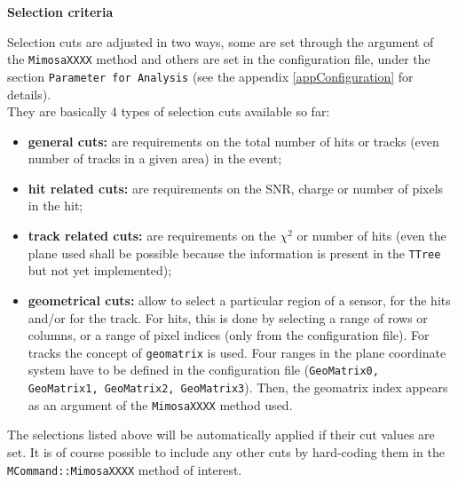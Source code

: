 \documentclass[a4paper, 12pt, twoside]{article}
\begin{document}
\vspace{0.8 cm}

\noindent
{\bf Selection criteria}

\noindent
Selection cuts are adjusted in two ways, some are set through the argument of the {\tt MimosaXXXX} method and others are set in the configuration file, under the section {\tt Parameter for Analysis} (see the appendix \ref{appConfiguration} for details).\\
They are basically 4 types of selection cuts available so far:
\begin{itemize}
\item {\bf general cuts:} are requirements on the total number of hits or tracks (even number of tracks in a given area) in the event;
\item {\bf hit related cuts:} are requirements on the SNR, charge or number of pixels in the hit;
\item {\bf track related cuts:} are requirements on the $\chi^{2}$ or number of hits (even the plane used shall be possible because the information is present in the {\tt TTree} but not yet implemented);
\item {\bf geometrical cuts:} allow to select a particular region of a sensor, for the hits and/or for the track. For hits, this is done by selecting a range of rows or columns, or a range of pixel indices (only from the configuration file). For tracks the concept of {\tt geomatrix} is used. Four ranges in the plane coordinate system have to be defined in the configuration file ({\tt GeoMatrix0, GeoMatrix1, GeoMatrix2, GeoMatrix3}). Then, the geomatrix index appears as an argument of the {\tt MimosaXXXX} method used.
\end{itemize}

\noindent
The selections listed above will be automatically applied if their cut values are set. It is of course possible to include any other cuts by hard-coding them in the {\tt MCommand::MimosaXXXX} method of interest.\\
\end{document}
